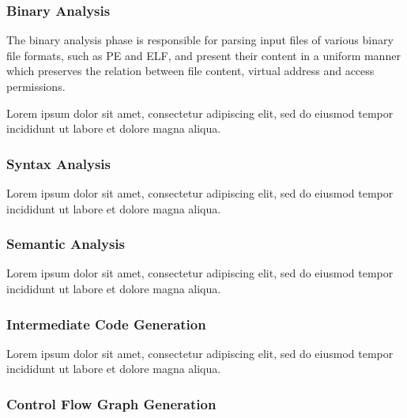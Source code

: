 \documentclass[12pt, a4paper]{article}
\begin{document}

\subsubsection{Binary Analysis}

The binary analysis phase is responsible for parsing input files of various binary file formats, such as PE and ELF, and present their content in a uniform manner which preserves the relation between file content, virtual address and access permissions.

Lorem ipsum dolor sit amet, consectetur adipiscing elit, sed do eiusmod tempor incididunt ut labore et dolore magna aliqua.


\subsubsection{Syntax Analysis}

Lorem ipsum dolor sit amet, consectetur adipiscing elit, sed do eiusmod tempor incididunt ut labore et dolore magna aliqua.


\subsubsection{Semantic Analysis}

Lorem ipsum dolor sit amet, consectetur adipiscing elit, sed do eiusmod tempor incididunt ut labore et dolore magna aliqua.


\subsubsection{Intermediate Code Generation}

Lorem ipsum dolor sit amet, consectetur adipiscing elit, sed do eiusmod tempor incididunt ut labore et dolore magna aliqua.


\subsubsection{Control Flow Graph Generation}
\end{document}
